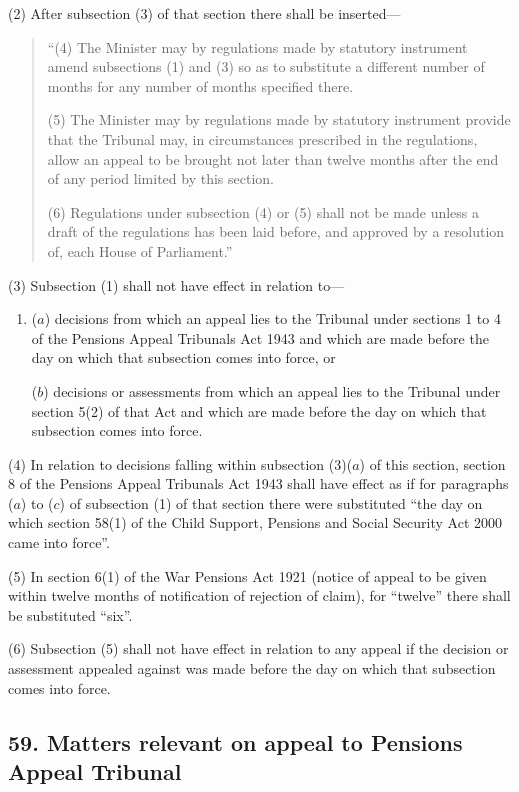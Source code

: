 \documentclass[12pt,a4paper]{article}
\begin{document}
(2) After subsection (3)  of that section there shall be inserted—
\begin{quotation}
“(4) The Minister may by regulations made by statutory instrument amend subsections (1)  and (3)  so as to substitute a different number of months for any number of months specified there.

(5) The Minister may by regulations made by statutory instrument provide that the Tribunal may, in circumstances prescribed in the regulations, allow an appeal to be brought not later than twelve months after the end of any period limited by this section.

(6) Regulations under subsection (4)  or (5)  shall not be made unless a draft of the regulations has been laid before, and approved by a resolution of, each House of Parliament.”
\end{quotation}

(3) Subsection (1)  shall not have effect in relation to—
\begin{enumerate}\item[]
($a$) decisions from which an appeal lies to the Tribunal under sections 1 to 4 of the Pensions Appeal Tribunals Act 1943 and which are made before the day on which that subsection comes into force, or

($b$) decisions or assessments from which an appeal lies to the Tribunal under section 5(2)  of that Act and which are made before the day on which that subsection comes into force.
\end{enumerate}

(4) In relation to decisions falling within subsection (3)($a$)  of this section, section 8 of the Pensions Appeal Tribunals Act 1943 shall have effect as if for paragraphs ($a$)  to ($c$)  of subsection (1)  of that section there were substituted “the day on which section 58(1)  of the Child Support, Pensions and Social Security Act 2000 came into force”.

(5) In section 6(1)  of the War Pensions Act 1921 (notice of appeal to be given within twelve months of notification of rejection of claim), for “twelve” there shall be substituted “six”.

(6) Subsection (5)  shall not have effect in relation to any appeal if the decision or assessment appealed against was made before the day on which that subsection comes into force.

\subsection{59. Matters relevant on appeal to Pensions Appeal Tribunal}
\end{document}
